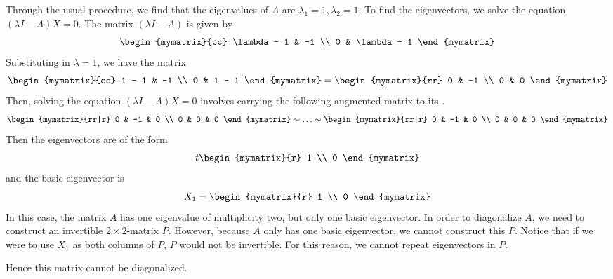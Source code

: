 \begin{solution}
  Through the usual procedure, we find that the eigenvalues of $A$ are
  $\lambda_1 =1, \lambda_2=1$.  To find the eigenvectors, we solve the
  equation $(\lambda I - A) X = 0$.  The matrix $(\lambda I -A)$ is
  given by
  \begin{equation*}
    \begin{mymatrix}{cc}
      \lambda - 1 & -1 \\
      0 & \lambda - 1
    \end{mymatrix}
  \end{equation*}
  Substituting in $\lambda = 1$, we have the matrix
  \begin{equation*}
    \begin{mymatrix}{cc}
      1 - 1 & -1 \\
      0 & 1 - 1
    \end{mymatrix}
    =
    \begin{mymatrix}{rr}
      0 & -1 \\
      0 & 0
    \end{mymatrix}
  \end{equation*}
  Then, solving the equation $(\lambda I - A) X = 0$ 
  involves carrying the following augmented matrix to its {\rref}. 
  \begin{equation*}
    \begin{mymatrix}{rr|r}
      0 & -1 & 0 \\
      0 & 0 & 0
    \end{mymatrix} 
    \roweq\ldots\roweq
    \begin{mymatrix}{rr|r}
      0 & -1 & 0 \\
      0 & 0 & 0
    \end{mymatrix} 
  \end{equation*}
  Then the eigenvectors are of the form
  \begin{equation*}
    t\begin{mymatrix}{r}
      1 \\
      0
    \end{mymatrix}
  \end{equation*}
  and the basic eigenvector is 
  \begin{equation*}
    X_1
    =
    \begin{mymatrix}{r}
      1 \\
      0
    \end{mymatrix}
  \end{equation*}
  In this case, the matrix $A$ has one eigenvalue of multiplicity two,
  but only one basic eigenvector. In order to diagonalize $A$, we need
  to construct an invertible $2\times 2$-matrix $P$. However, because
  $A$ only has one basic eigenvector, we cannot construct this
  $P$. Notice that if we were to use $X_1$ as both columns of $P$, $P$
  would not be invertible. For this reason, we cannot repeat
  eigenvectors in $P$.

  Hence this matrix cannot be diagonalized. 
\end{solution}

